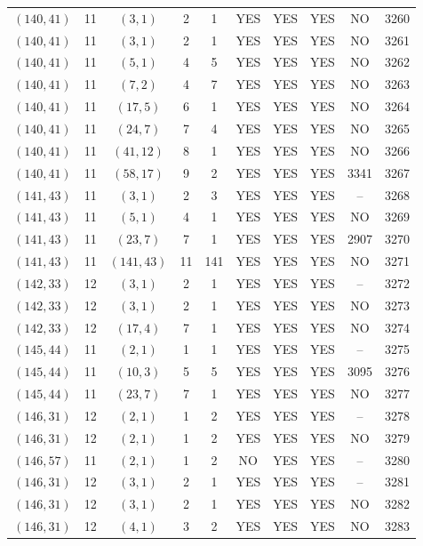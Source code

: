 \begin{longtable}{|c|c|c|c|c|c|c|c|c|c|}
$(140, 41)$ & 11 & $(3, 1)$ & 2 & 1 & YES & YES & YES & NO & 3260\\
$(140, 41)$ & 11 & $(3, 1)$ & 2 & 1 & YES & YES & YES & NO & 3261\\
$(140, 41)$ & 11 & $(5, 1)$ & 4 & 5 & YES & YES & YES & NO & 3262\\
$(140, 41)$ & 11 & $(7, 2)$ & 4 & 7 & YES & YES & YES & NO & 3263\\
$(140, 41)$ & 11 & $(17, 5)$ & 6 & 1 & YES & YES & YES & NO & 3264\\
$(140, 41)$ & 11 & $(24, 7)$ & 7 & 4 & YES & YES & YES & NO & 3265\\
$(140, 41)$ & 11 & $(41, 12)$ & 8 & 1 & YES & YES & YES & NO & 3266\\
$(140, 41)$ & 11 & $(58, 17)$ & 9 & 2 & YES & YES & YES & 3341 & 3267\\
$(141, 43)$ & 11 & $(3, 1)$ & 2 & 3 & YES & YES & YES & -- & 3268\\
$(141, 43)$ & 11 & $(5, 1)$ & 4 & 1 & YES & YES & YES & NO & 3269\\
$(141, 43)$ & 11 & $(23, 7)$ & 7 & 1 & YES & YES & YES & 2907 & 3270\\
$(141, 43)$ & 11 & $(141, 43)$ & 11 & 141 & YES & YES & YES & NO & 3271\\
$(142, 33)$ & 12 & $(3, 1)$ & 2 & 1 & YES & YES & YES & -- & 3272\\
$(142, 33)$ & 12 & $(3, 1)$ & 2 & 1 & YES & YES & YES & NO & 3273\\
$(142, 33)$ & 12 & $(17, 4)$ & 7 & 1 & YES & YES & YES & NO & 3274\\
$(145, 44)$ & 11 & $(2, 1)$ & 1 & 1 & YES & YES & YES & -- & 3275\\
$(145, 44)$ & 11 & $(10, 3)$ & 5 & 5 & YES & YES & YES & 3095 & 3276\\
$(145, 44)$ & 11 & $(23, 7)$ & 7 & 1 & YES & YES & YES & NO & 3277\\
$(146, 31)$ & 12 & $(2, 1)$ & 1 & 2 & YES & YES & YES & -- & 3278\\
$(146, 31)$ & 12 & $(2, 1)$ & 1 & 2 & YES & YES & YES & NO & 3279\\
$(146, 57)$ & 11 & $(2, 1)$ & 1 & 2 & NO & YES & YES & -- & 3280\\
$(146, 31)$ & 12 & $(3, 1)$ & 2 & 1 & YES & YES & YES & -- & 3281\\
$(146, 31)$ & 12 & $(3, 1)$ & 2 & 1 & YES & YES & YES & NO & 3282\\
$(146, 31)$ & 12 & $(4, 1)$ & 3 & 2 & YES & YES & YES & NO & 3283\\

\end{longtable}
